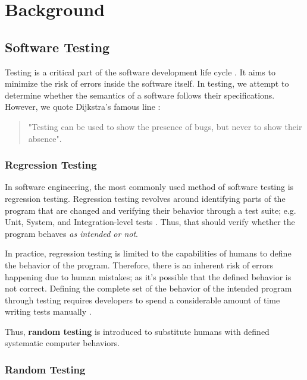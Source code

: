 \chapter{Background \label{sec:background}}

\section{Software Testing}
\label{sec:Testing}

Testing is a critical part of the software development life cycle \cite{testing}. It aims to minimize the risk of errors inside the software itself.
In testing, we attempt to determine whether the semantics of a software follows their specifications. However, we quote Dijkstra's famous line \cite{dahl_structured_1972}: 

\begin{quote}
    "Testing can be used to show the presence of bugs, but never to show their absence".
\end{quote}

\subsection{Regression Testing}

In software engineering, the most commonly used method of software testing is regression testing. Regression testing revolves around 
identifying parts of the program that are changed and verifying their behavior through a test suite; e.g. Unit, System, and Integration-level tests
\cite{testing}. Thus, that should verify whether the program behaves \emph{as intended or not}.

In practice, regression testing is limited to the capabilities of humans to define the behavior of the program. Therefore, there is an inherent 
risk of errors happening due to human mistakes; as it's possible that the defined behavior is not correct. Defining the complete set of the behavior 
of the intended program through testing requires developers to spend a considerable amount of time writing tests manually \cite{differentialTesting}. 

Thus, \textbf{random testing} is introduced to substitute humans with defined systematic computer behaviors.

\subsection{Random Testing}

